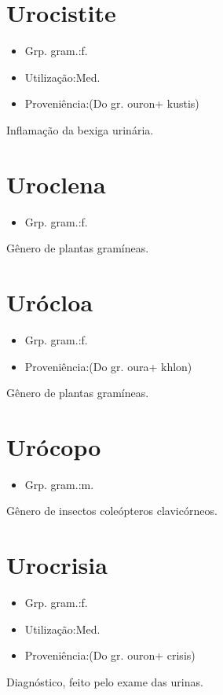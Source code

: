 \documentclass{article}
\begin{document}
\section{Urocistite}
\begin{itemize}
\item {Grp. gram.:f.}
\end{itemize}
\begin{itemize}
\item {Utilização:Med.}
\end{itemize}
\begin{itemize}
\item {Proveniência:(Do gr. \textunderscore ouron\textunderscore  + \textunderscore kustis\textunderscore )}
\end{itemize}
Inflamação da bexiga urinária.
\section{Uroclena}
\begin{itemize}
\item {Grp. gram.:f.}
\end{itemize}
Gênero de plantas gramíneas.
\section{Urócloa}
\begin{itemize}
\item {Grp. gram.:f.}
\end{itemize}
\begin{itemize}
\item {Proveniência:(Do gr. \textunderscore oura\textunderscore  + \textunderscore khlon\textunderscore )}
\end{itemize}
Gênero de plantas gramíneas.
\section{Urócopo}
\begin{itemize}
\item {Grp. gram.:m.}
\end{itemize}
Gênero de insectos coleópteros clavicórneos.
\section{Urocrisia}
\begin{itemize}
\item {Grp. gram.:f.}
\end{itemize}
\begin{itemize}
\item {Utilização:Med.}
\end{itemize}
\begin{itemize}
\item {Proveniência:(Do gr. \textunderscore ouron\textunderscore  + \textunderscore crisis\textunderscore )}
\end{itemize}
Diagnóstico, feito pelo exame das urinas.
\end{document}
